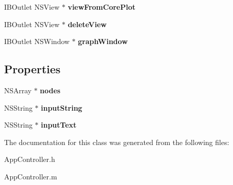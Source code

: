 \begin{DoxyCompactItemize}
\item 
\hypertarget{interface_app_controller_a0e2c2fc4cfe7366ea117393216bae16a}{
IBOutlet NSView $\ast$ {\bfseries viewFromCorePlot}}
\label{interface_app_controller_a0e2c2fc4cfe7366ea117393216bae16a}

\item 
\hypertarget{interface_app_controller_afc67f1a5c6c9022e34eb5a5c87984925}{
IBOutlet NSView $\ast$ {\bfseries deleteView}}
\label{interface_app_controller_afc67f1a5c6c9022e34eb5a5c87984925}

\item 
\hypertarget{interface_app_controller_a35d7b9b229d9bc46634ebaae8e4bdf89}{
IBOutlet NSWindow $\ast$ {\bfseries graphWindow}}
\label{interface_app_controller_a35d7b9b229d9bc46634ebaae8e4bdf89}

\end{DoxyCompactItemize}
\subsection*{Properties}
\begin{DoxyCompactItemize}
\item 
\hypertarget{interface_app_controller_af6cdcf8f751cf0b4facae592d560a0c7}{
NSArray $\ast$ {\bfseries nodes}}
\label{interface_app_controller_af6cdcf8f751cf0b4facae592d560a0c7}

\item 
\hypertarget{interface_app_controller_ab936088072d76130bee838267afbb0f8}{
NSString $\ast$ {\bfseries inputString}}
\label{interface_app_controller_ab936088072d76130bee838267afbb0f8}

\item 
\hypertarget{interface_app_controller_ad42a41bda01d933b948c73a4f0ec249f}{
NSString $\ast$ {\bfseries inputText}}
\label{interface_app_controller_ad42a41bda01d933b948c73a4f0ec249f}

\end{DoxyCompactItemize}


The documentation for this class was generated from the following files:\begin{DoxyCompactItemize}
\item 
AppController.h\item 
AppController.m\end{DoxyCompactItemize}

